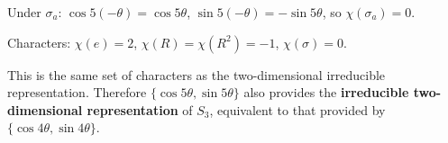 \documentclass[12pt]{article}
\begin{document}
Under $\sigma_a$: $\cos 5(-\theta) = \cos 5\theta$, $\sin 5(-\theta) = -\sin 5\theta$, so $\chi(\sigma_a) = 0$.

Characters: $\chi(e) = 2$, $\chi(R) = \chi(R^2) = -1$, $\chi(\sigma) = 0$.

This is the same set of characters as the two-dimensional irreducible representation. Therefore $\{\cos 5\theta, \sin 5\theta\}$ also provides the \textbf{irreducible two-dimensional representation} of $S_3$, equivalent to that provided by $\{\cos 4\theta, \sin 4\theta\}$.
\end{document}
